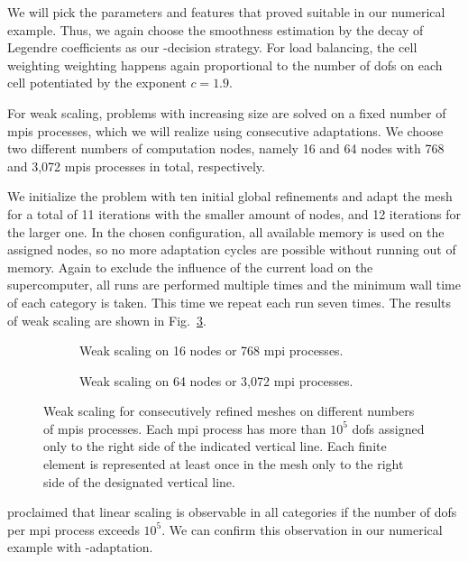 We will pick the parameters and features that proved suitable in our numerical example. Thus, we again choose the smoothness estimation by the decay of Legendre coefficients as our \hp-decision strategy. For load balancing, the cell weighting weighting happens again proportional to the number of \glspl{dof} on each cell potentiated by the exponent $c = 1.9$.



For weak scaling, problems with increasing size are solved on a fixed number of \glspl{mpi} processes, which we will realize using consecutive adaptations. We choose two different numbers of computation nodes, namely 16 and 64 nodes with 768 and 3,072 \glspl{mpi} processes in total, respectively.

We initialize the problem with ten initial global refinements and adapt the mesh for a total of 11 iterations with the smaller amount of nodes, and 12 iterations for the larger one. In the chosen configuration, all available memory is used on the assigned nodes, so no more adaptation cycles are possible without running out of memory. Again to exclude the influence of the current load on the supercomputer, all runs are performed multiple times and the minimum wall time of each category is taken. This time we repeat each run seven times. The results of weak scaling are shown in Fig.~\ref{fig:weak}.

\begin{figure}
\begin{subfigure}{1\textwidth}
  \centering
  \caption{Weak scaling on 16 nodes or 768 \gls{mpi} processes.}
  \label{fig:weak-nodes16}
\end{subfigure}
\begin{subfigure}{1\textwidth}
  \centering
  \caption{Weak scaling on 64 nodes or 3,072 \gls{mpi} processes.}
  \label{fig:weak-nodes64}
\end{subfigure}
\caption{Weak scaling for consecutively refined meshes on different numbers of \glspl{mpi} processes. Each \gls{mpi} process has more than $10^5$ \glspl{dof} assigned only to the right side of the indicated vertical line. Each finite element is represented at least once in the mesh only to the right side of the designated vertical line.}
\label{fig:weak}
\end{figure}

\textcite{bangerth2012} proclaimed that linear scaling is observable in all categories if the number of \glspl{dof} per \gls{mpi} process exceeds $10^5$. We can confirm this observation in our numerical example with \hp-adaptation. %


